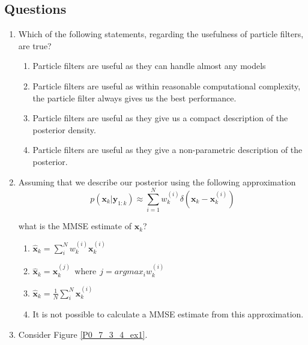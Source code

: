 

\subsection{Questions}
\label{questions_particle_filters}

\begin{enumerate}
\item Which of the following statements, regarding the usefulness of particle filters, are true?


\begin{enumerate}
\item Particle filters are useful as they can handle almost any models
\item Particle filters are useful as within reasonable computational complexity, the particle filter always gives us the best performance. 
\item Particle filters are useful as they give us a compact description of the posterior density. 
\item Particle filters are useful as they give a non-parametric description of the posterior.
\end{enumerate}
\item Assuming that we describe our posterior using the following approximation
\begin{equation}
p(\mathbf{x}_k | \mathbf{y}_{1:k}) \approx \sum_{i=1}^N w_{k}^{(i)} \delta (\mathbf{x}_k -\mathbf{x}_{k}^{(i)})
\end{equation}

what is the MMSE estimate of $\mathbf{x}_k$?
\begin{enumerate}
\item $\hat{\mathbf{x}}_k = \sum_{i}^{N} w_{k}^{(i)} \mathbf{x}_{k}^{(i)}$
\item $\hat{\mathbf{x}}_k = \mathbf{x}_{k}^{(j)} ~~ \text{where} ~~ j = argmax_i w_{k}^{(i)}$
\item $\hat{\mathbf{x}}_k = \frac{1}{N}\sum_{i}^{N}  \mathbf{x}_{k}^{(i)}$
\item It is not possible to calculate a MMSE estimate from this approximation. 
\end{enumerate}
\item Consider Figure \ref{P0_7_3_4_ex1}.


\end{enumerate}
